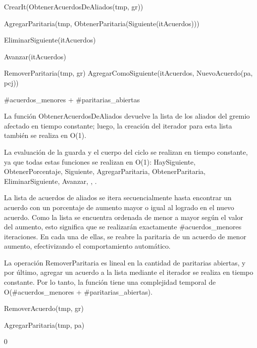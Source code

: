 {

	\state {} \asig CrearIt(ObtenerAcuerdosDeAliados(tmp, gr))		
			
		\state

		\state AgregarParitaria(tmp, ObtenerParitaria(Siguiente(itAcuerdos)))		

		\state EliminarSiguiente(itAcuerdos)										

		\state
		\state Avanzar(itAcuerdos)													
	\endwhile
	\state

	\state {} \asig RemoverParitaria(tmp, gr)				
	\state AgregarComoSiguiente(itAcuerdos, NuevoAcuerdo(pa, pcj))			
}
{\#acuerdos\_menores + \#paritarias\_abiertas}
{La función ObtenerAcuerdosDeAliados devuelve la lista de los aliados del gremio afectado en tiempo constante; luego, la creación del iterador para esta lista también se realiza en O(1). 

\hspace{10pt} La evaluación de la guarda y el cuerpo del ciclo se realizan en tiempo constante, ya que todas estas funciones se realizan en O(1): HaySiguiente, ObtenerPorcentaje, Siguiente, AgregarParitaria, ObtenerParitaria, EliminarSiguiente, Avanzar, \lyl, \menor.

\hspace{10pt} La lista de acuerdos de aliados se itera secuencialmente hasta encontrar un acuerdo con un porcentaje de aumento mayor o igual al logrado en el nuevo acuerdo. Como la lista se encuentra ordenada de menor a mayor según el valor del aumento, esto significa que se realizarán exactamente \#acuerdos\_menores iteraciones. En cada una de ellas, se reabre la paritaria de un acuerdo de menor aumento, efectivizando el comportamiento automático.

\hspace{10pt} La operación RemoverParitaria es lineal en la cantidad de paritarias abiertas, y por último, agregar un acuerdo a la lista mediante el iterador se realiza en tiempo constante. Por lo tanto, la función tiene una complejidad temporal de O(\#acuerdos\_menores + \#paritarias\_abiertas).  }

{
	\state {} \asig RemoverAcuerdo(tmp, gr)			

	\state AgregarParitaria(tmp, pa)									
}
{0}
{\addtocounter{lipsumcounter}{1}}

